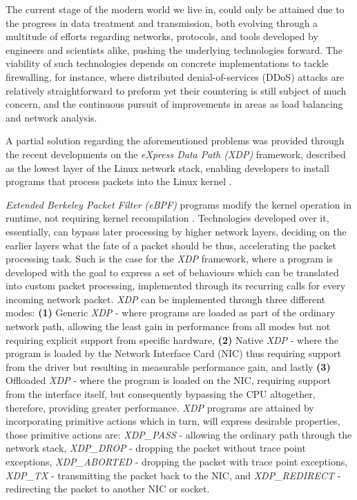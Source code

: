 The current stage of the modern world we live in, could only be attained due to the progress in data treatment and transmission, both evolving through a multitude of efforts regarding networks, protocols, and tools developed by engineers and scientists alike, pushing the underlying technologies forward.
The viability of such technologies depends on concrete implementations to tackle firewalling\cite{XDPDDoS}, for instance, where distributed denial-of-services (DDoS) attacks are relatively straightforward to preform yet their countering is still subject of much concern, and the continuous pursuit of improvements in areas as load balancing and network analysis.

A partial solution regarding the aforementioned problems was provided through the recent developments on the \textit{eXpress Data Path (XDP)} framework, described as the lowest layer of the Linux network stack, enabling developers to install programs that process packets into the Linux kernel \cite{FastXDP}.

\textit{Extended Berkeley Packet Filter (eBPF)} programs modify the kernel operation in runtime, not requiring kernel recompilation \cite{FastXDP}.
Technologies developed over it, essentially, can bypass later processing by higher network layers, deciding on the earlier layers what the fate of a packet should be thus, accelerating the packet processing task.
Such is the case for the \textit{XDP} framework, where a program is developed with the goal to express a set of behaviours which can be translated into custom packet processing, implemented through its recurring calls for every incoming network packet.
\textit{XDP} can be implemented through three different modes: \textbf{(1)} Generic \textit{XDP} - where programs are loaded as part of the ordinary network path, allowing the least gain in performance from all modes but not requiring explicit support from specific hardware, \textbf{(2)} Native \textit{XDP} - where the program is loaded by the Network Interface Card (NIC) thus requiring support from the driver but resulting in measurable performance gain, and lastly \textbf{(3)} Offloaded \textit{XDP} - where the program is loaded on the NIC, requiring support from the interface itself, but consequently bypassing the CPU altogether, therefore, providing greater performance.
\textit{XDP} programs are attained by incorporating primitive actions which in turn, will express desirable properties, those primitive actions are: \textit{XDP\_PASS} - allowing the ordinary path through the network stack, \textit{XDP\_DROP} - dropping the packet without trace point exceptions, \textit{XDP\_ABORTED} - dropping the packet with trace point exceptions, \textit{XDP\_TX} - transmitting the packet back to the NIC, and \textit{XDP\_REDIRECT} - redirecting the packet to another NIC or socket.

